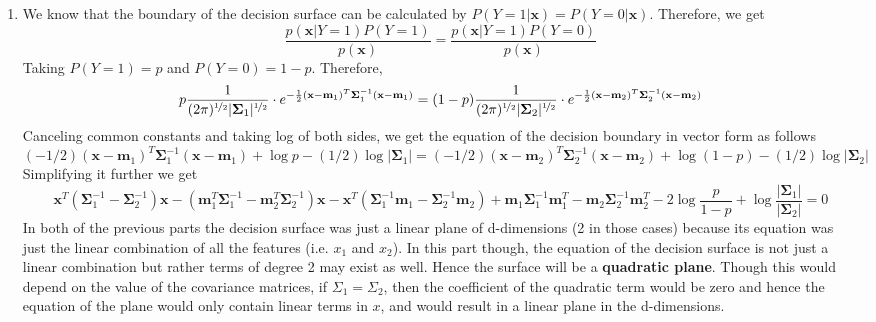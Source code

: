 \documentclass[twoside]{article}
\begin{document}
\begin{enumerate}
	\item
	We know that the boundary of the decision surface can be calculated by $P(Y=1|\mathbf{x})=P(Y=0|\mathbf{x})$.
	Therefore, we get
	\begin{equation*}
		\frac{p(\mathbf{x}|Y=1)P(Y=1)}{p(\mathbf{x})} = \frac{p(\mathbf{x}|Y=1)P(Y=0)}{p(\mathbf{x})}
	\end{equation*}
	Taking $P(Y=1) = p$ and $P(Y=0) = 1 - p$. Therefore,
	\begin{equation*}
		p\frac{1}{(2\pi)^{\nicefrac{1}{2}} |\mathbf{\Sigma}_{1}|^{\nicefrac{1}{2}}}\cdot e^{-\frac{1}{2}(\mathbf{x}-\mathbf{m}_{1})^{T}\mathbf{\Sigma}_{1}^{-1}(\mathbf{x}-\mathbf{m}_{1})} = (1-p)\frac{1}{(2\pi)^{\nicefrac{1}{2}} |\mathbf{\Sigma}_{2}|^{\nicefrac{1}{2}}}\cdot e^{-\frac{1}{2}(\mathbf{x}-\mathbf{m}_{2})^{T}\mathbf{\Sigma}_{2}^{-1}(\mathbf{x}-\mathbf{m}_{2})}
	\end{equation*}
	Canceling common constants and taking log of both sides, we get the equation of the decision boundary in vector form as follows
	\begin{equation*}
		(-1/2)(\mathbf{x}-\mathbf{m}_{1})^{T}\mathbf{\Sigma}_{1}^{-1}(\mathbf{x}-\mathbf{m}_{1}) + \log p -(1/2)\log|\mathbf{\Sigma}_1|= (-1/2)(\mathbf{x}-\mathbf{m}_{2})^{T}\mathbf{\Sigma}_{2}^{-1}(\mathbf{x}-\mathbf{m}_{2}) + \log (1 - p) -(1/2)\log|\mathbf{\Sigma}_2|
	\end{equation*}
	Simplifying it further we get
	\begin{equation*}
		\mathbf{x}^T(\mathbf{\Sigma}_1^{-1} - \mathbf{\Sigma}_2^{-1})\mathbf{x} - (\mathbf{m}_{1}^T\mathbf{\Sigma}_1^{-1} - \mathbf{m}_{2}^T\mathbf{\Sigma}_2^{-1})\mathbf{x} - \mathbf{x}^T(\mathbf{\Sigma}_1^{-1}\mathbf{m}_{1} - \mathbf{\Sigma}_2^{-1}\mathbf{m}_{2}) + \mathbf{m}_{1}\mathbf{\Sigma}_1^{-1}\mathbf{m}_{1}^T - \mathbf{m}_{2}\mathbf{\Sigma}_2^{-1}\mathbf{m}_{2}^T -2\log \frac{p}{1-p} + \log\frac{|\mathbf{\Sigma}_1|}{|\mathbf{\Sigma}_2|} = 0
	\end{equation*}
	In both of the previous parts the decision surface was just a linear plane of d-dimensions (2 in those cases) because its equation was just the linear combination of all the features (i.e. $x_1$ and $x_2$). In this part though, the equation of the decision surface is not just a linear combination but rather terms of degree 2 may exist as well. Hence the surface will be a \textbf{quadratic plane}. Though this would depend on the value of the covariance matrices, if $\Sigma_1 = \Sigma_2$, then the coefficient of the quadratic term would be zero and hence the equation of the plane would only contain linear terms in $x$, and would result in a linear plane in the d-dimensions.

\end{enumerate}
\end{document}
